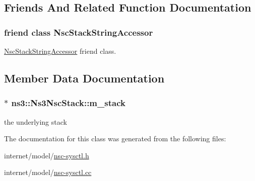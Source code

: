 \subsection{Friends And Related Function Documentation}
\subsubsection[{\texorpdfstring{Nsc\+Stack\+String\+Accessor}{NscStackStringAccessor}}]{\setlength{\rightskip}{0pt plus 5cm}friend class {\bf Nsc\+Stack\+String\+Accessor}\hspace{0.3cm}{\ttfamily [friend]}}\hypertarget{classns3_1_1Ns3NscStack_a65574a3a244d1d85dbf907e4a6a9f639}{}\label{classns3_1_1Ns3NscStack_a65574a3a244d1d85dbf907e4a6a9f639}


\hyperlink{classns3_1_1NscStackStringAccessor}{Nsc\+Stack\+String\+Accessor} friend class. 



\subsection{Member Data Documentation}
\subsubsection[{\texorpdfstring{m\+\_\+stack}{m_stack}}]{$\ast$ ns3\+::\+Ns3\+Nsc\+Stack\+::m\+\_\+stack\hspace{0.3cm}{\ttfamily [private]}}\hypertarget{classns3_1_1Ns3NscStack_a2de1abd9c5f7bca7321570353649ef93}{}\label{classns3_1_1Ns3NscStack_a2de1abd9c5f7bca7321570353649ef93}


the underlying stack 



The documentation for this class was generated from the following files\+:\begin{DoxyCompactItemize}
\item 
internet/model/\hyperlink{nsc-sysctl_8h}{nsc-\/sysctl.\+h}\item 
internet/model/\hyperlink{nsc-sysctl_8cc}{nsc-\/sysctl.\+cc}\end{DoxyCompactItemize}
